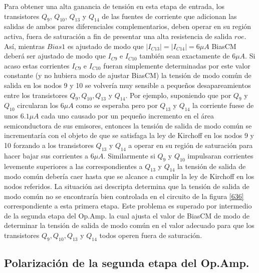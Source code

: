 \documentclass[12pt,a4paper,final,headinclude,footinclude,BCOR5mm]{scrartcl}
\begin{document}
Para obtener una alta ganancia de tensión en esta etapa de entrada, los transistores $Q_{9}$, $Q_{10}$, $Q_{13}$ y $Q_{14}$ de las fuentes de corriente que adicionan las salidas de ambos pares diferenciales complementarios, deben operar en su región activa, fuera de saturación a fin de presentar una alta resistencia de salida $roe$.\\

Así, mientras $Bias1$ es ajustado de modo que $|I_{C13}|=|I_{C14}|=6 \mu A$ BiasCM deberá ser ajustado de modo que $I_{C9}$ e $I_{C10}$ también sean exactamente de $6 \mu A$. Si acaso estas corrientes $I_{C9}$ e $I_{C10}$ fueran simplemente determinadas por este valor constante (y no hubiera modo de ajustar BiasCM) la tensión de modo común de salida en los nodos 9 y 10 se volvería muy sensible a pequeños desapareamientos entre los transistores $Q_{9},Q_{10},Q_{13}$ y $Q_{14}$. Por ejemplo, suponiendo que por $Q_{9}$ y $Q_{10}$ circularan los $6 \mu A$ como se esperaba pero por $Q_{13}$ y $Q_{14}$ la corriente fuese de unos $6.1 \mu A$ cada uno causado por un pequeño incremento en el área semiconductora de sus emisores, entonces la tensión de salida de modo común se incrementaría con el objeto de que se satisfaga la ley de Kirchoff en los nodos 9 y 10 forzando a los transistores $Q_{13}$ y $Q_{14}$ a operar en su región de saturación para hacer bajar sus corrientes a $6 \mu A$. Similarmente si $Q_{9}$ y $Q_{10}$ impulsaran corrientes levemente superiores a las correspondientes a $Q_{13}$ y $Q_{14}$ la tensión de salida de modo común debería caer hasta que se alcance a cumplir la ley de Kirchoff en los nodos referidos. La situación asi descripta determina que la tensión de salida de modo común no se encontraría bien controlada en el circuito de la figura \ref{636} correspondiente a esta primera etapa. Este problema es superado por intermedio de la segunda etapa del Op.Amp. la cual ajusta el valor de BiasCM de modo de determinar la tensión de salida de modo común en el valor adecuado para que los transistores $Q_{9},Q_{10},Q_{13}$ y $Q_{14}$ todos operen fuera de saturación.

\subsection{Polarización de la segunda etapa del Op.Amp.}
\end{document}
